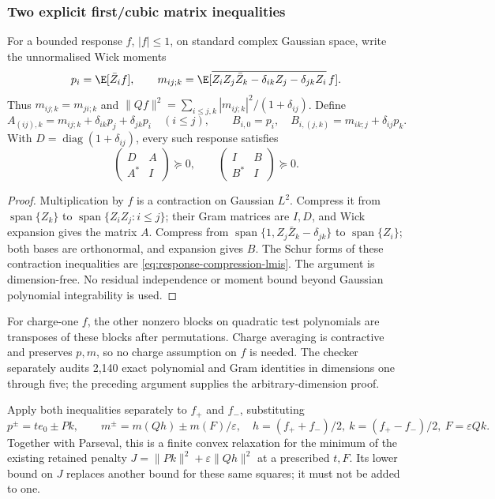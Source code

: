 \subsubsection{Two explicit first/cubic matrix inequalities}
For a bounded response $f$, $|f|\le1$, on standard complex Gaussian space,
write the unnormalised Wick moments
\[
 p_i=\E[\bar Z_i f],\qquad
 m_{ij;k}=\E[\overline{Z_iZ_j\bar Z_k-\delta_{ik}Z_j-\delta_{jk}Z_i}\,f].
\]
Thus $m_{ij;k}=m_{ji;k}$ and
$\|Qf\|^2=\sum_{i\le j,k}|m_{ij;k}|^2/(1+\delta_{ij})$.
Define
\[
 A_{(ij),k}=m_{ij;k}+\delta_{ik}p_j+\delta_{jk}p_i\quad(i\le j),
 \qquad B_{i,0}=p_i,\quad B_{i,(j,k)}=m_{ik;j}+\delta_{ij}p_k.
\]
With $D=\operatorname{diag}(1+\delta_{ij})$, every such response satisfies
\begin{equation}\label{eq:response-compression-lmis}
 \boxed{\quad
 \begin{pmatrix}D&A\\A^*&I\end{pmatrix}\succeq0,
 \qquad
 \begin{pmatrix}I&B\\B^*&I\end{pmatrix}\succeq0.
 \quad}
\end{equation}
\begin{proof}
Multiplication by $f$ is a contraction on Gaussian $L^2$.
Compress it from $\operatorname{span}\{Z_k\}$ to
$\operatorname{span}\{Z_iZ_j:i\le j\}$; their Gram matrices are $I,D$,
and Wick expansion gives the matrix $A$.
Compress from $\operatorname{span}\{1,Z_j\bar Z_k-\delta_{jk}\}$ to
$\operatorname{span}\{Z_i\}$; both bases are orthonormal, and expansion
gives $B$. The Schur forms of these contraction inequalities are
\eqref{eq:response-compression-lmis}.
The argument is dimension-free. No residual independence or moment bound
beyond Gaussian polynomial integrability is used.
\end{proof}
For charge-one $f$, the other nonzero blocks on quadratic test polynomials
are transposes of these blocks after permutations. Charge averaging is
contractive and preserves $p,m$, so no charge assumption on $f$ is needed.
The checker separately audits 2,140 exact polynomial and Gram identities
in dimensions one through five; the preceding argument supplies the
arbitrary-dimension proof.

Apply both inequalities separately to $f_+$ and $f_-$, substituting
\[
 p^\pm=te_0\pm Pk,\qquad m^\pm=m(Qh)\pm m(F)/\varepsilon,
 \quad h=(f_++f_-)/2,\ k=(f_+-f_-)/2,\ F=\varepsilon Qk.
\]
Together with Parseval, this is a finite convex relaxation for the minimum
of the existing retained penalty
$J=\|Pk\|^2+\varepsilon\|Qh\|^2$ at a prescribed $t,F$.
Its lower bound on $J$ replaces another bound for these same squares;
it must not be added to one.

